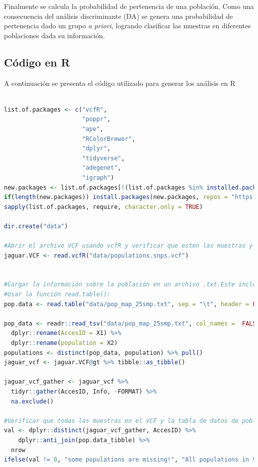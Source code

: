 \documentclass{article}
\begin{document}
Finalmente se calcula la probabilidad de pertenencia de una población. Como una consecuencia del análisis discriminante (DA) se genera una probabilidad de pertenencia dado un grupo \textit{a priori}, logrando clasificar las muestras en diferentes poblaciones dada su información.

\newpage

\subsection{Código en R}
A continuación se presenta el código utilizado para generar los análisis en R

\begin{lstlisting}[language=R]

list.of.packages <- c("vcfR",
                      "poppr",
                      "ape",
                      "RColorBrewer",
                      "dplyr",
                      "tidyverse",
                      "adegenet",
                      "igraph")
new.packages <- list.of.packages[!(list.of.packages %in% installed.packages()[,"Package"])]
if(length(new.packages)) install.packages(new.packages, repos = "https://cloud.r-project.org/")
sapply(list.of.packages, require, character.only = TRUE)

dir.create("data")

#Abrir el archivo VCF usando vcfR y verificar que esten las muestras y SNPs cargados.
jaguar.VCF <- read.vcfR("data/populations.snps.vcf")


#Cargar la información sobre la población en un archivo .txt.Este incluye ID y nombre de la población.
#Usar la función read.table():
pop.data <- read.table("data/pop_map_25smp.txt", sep = "\t", header = FALSE, col.names = c("AccesID", "population")) 

pop_data <- readr::read_tsv("data/pop_map_25smp.txt", col_names =  FALSE) %>% 
  dplyr::rename(AccesID = X1) %>% 
  dplyr::rename(population = X2)
populations <- distinct(pop_data, population) %>% pull()
jaguar_vcf <- jaguar.VCF@gt %>% tibble::as_tibble() 

jaguar_vcf_gather <- jaguar_vcf %>% 
  tidyr::gather(AccesID, Info, -FORMAT) %>% 
  na.exclude() 

#Verificar que todas las muestras en el VCF y la tabla de datos de población estén incluidas.
val <- dplyr::distinct(jaguar_vcf_gather, AccesID) %>% 
    dplyr::anti_join(pop.data_tibble) %>%
  nrow 
ifelse(val != 0, "some populations are missing!", "All populations in VFC ok" )





\end{lstlisting}
\end{document}
